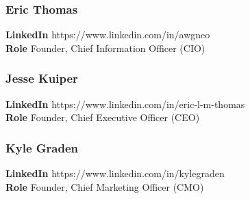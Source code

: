 \documentclass[11pt]{article}
\begin{document}
\subsubsection{Eric Thomas}
\begin{minipage}{\textwidth}
\textbf{LinkedIn} https://www.linkedin.com/in/awgneo\\
\textbf{Role} Founder, Chief Information Officer (CIO)\\
\end{minipage}

\subsubsection{Jesse Kuiper}
\begin{minipage}{\textwidth}
\textbf{LinkedIn} https://www.linkedin.com/in/eric-l-m-thomas\\
\textbf{Role} Founder, Chief Executive Officer (CEO)\\
\end{minipage}

\subsubsection{Kyle Graden}
\begin{minipage}{\textwidth}
\textbf{LinkedIn} https://www.linkedin.com/in/kylegraden\\
\textbf{Role} Founder, Chief Marketing Officer (CMO)\\
\end{minipage}

\pagebreak

\printbibliography

\vspace*{\fill}

\begin{flushright}

\pdfcreationdate
\end{flushright}
\end{document}
